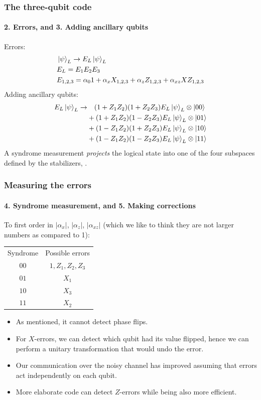 \documentclass{beamer}
\renewcommand{\(}{\left(}
\renewcommand{\)}{\right)}
\renewcommand{\[}{\left[}
\renewcommand{\]}{\right]}
\begin{document}
\begin{frame}
    \frametitle{The three-qubit code}
    \framesubtitle{2. Errors, and 3. Adding ancillary qubits}
    Errors:
    \begin{align*}
        &\ket{\psi}_L \rightarrow E_L\ket{\psi}_L \\
        &E_L = E_1E_2E_3 \\ 
        &E_{1,2,3} = \alpha_0 1 + \alpha_x X_{1,2,3} + \alpha_z Z_{1,2,3} + \alpha_{xz}  XZ_{1,2,3}
    \end{align*}
    \pause
    Adding ancillary qubits: 
    \begin{align*}
        E_L \ket{\psi}_L \rightarrow  & \ \ \ (1+Z_1Z_2)(1+Z_2 Z_3) E_L \ket{\psi}_L \otimes \ket{00} \\ 
        &+(1+Z_1Z_2)(1-Z_2 Z_3) E_L \ket{\psi}_L \otimes \ket{01} \\ 
        &+(1-Z_1Z_2)(1+Z_2 Z_3) E_L \ket{\psi}_L \otimes \ket{10} \\ 
        &+(1-Z_1Z_2)(1-Z_2 Z_3) E_L \ket{\psi}_L \otimes \ket{11} \\ 
    \end{align*}
    A syndrome measurement \emph{projects} the logical state into one of the four subspaces defined by the stabilizers, \citep{Shor_1995}.
\end{frame}
\begin{frame}
    \frametitle{Measuring the errors}
    \framesubtitle{4. Syndrome measurement, and 5. Making corrections}  

    To first order in $|\alpha_x|$, $|\alpha_z|$, $|\alpha_{xz}|$ (which we like to think they are not larger numbers as compared to 1): 
    \begin{table}
        \begin{tabular}{ |c c| }
            \hline
            Syndrome & Possible errors \\ 
            $00$ & $1, Z_1, Z_2, Z_3$ \\ 
            $01$ & $X_1$ \\
            $10$ & $X_3$ \\
            $11$ & $X_2$ \\
            \hline
        \end{tabular}
    \end{table}
    \pause
    \begin{itemize}
        \item As mentioned, it cannot detect phase flips. 
        \item For $X$-errors, we can detect which qubit had its value flipped, hence we can perform a unitary transformation that would undo the error. 
        \item Our communication over the noisy channel has improved assuming that errors act independently on each qubit.
        \item More elaborate code can detect $Z$-errors while being also more efficient. 
    \end{itemize}
\end{frame}
\end{document}
